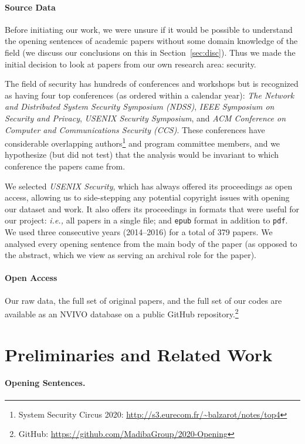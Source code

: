 \documentclass[sigconf]{acmart}
\newcommand{\ie}{\textit{i.e.,}\xspace}
\begin{document}
\paragraph{Source Data} Before initiating our work, we were unsure if it would be possible to understand the opening sentences of academic papers without some domain knowledge of the field (we discuss our conclusions on this in Section~\ref{sec:disc}). Thus we made the initial decision to look at papers from our own research area: security.

The field of security has hundreds of conferences and workshops but is recognized as having four top conferences (as ordered within a calendar year): \textit{The Network and Distributed System Security Symposium (NDSS)}, \textit{IEEE Symposium on Security and Privacy}, \textit{USENIX Security Symposium}, and \textit{ACM Conference on Computer and Communications Security (CCS)}. These conferences have considerable overlapping authors\footnote{System Security Circus 2020: \url{http://s3.eurecom.fr/~balzarot/notes/top4}} and program committee members, and we hypothesize (but did not test) that the analysis would be invariant to which conference the papers came from.

We selected \textit{USENIX Security}, which has always offered its proceedings as open access, allowing us to side-stepping any potential copyright issues with opening our dataset and work. It also offers its proceedings in formats that were useful for our project: \ie all papers in a single file; and \texttt{epub} format in addition to \texttt{pdf}. We used three consecutive years (2014--2016) for a total of 379 papers. We analysed every opening sentence from the main body of the paper (as opposed to the abstract, which we view as serving an archival role for the paper).

	\paragraph{Open Access} Our raw data, the full set of original papers, and the full set of our codes are available as an NVIVO database on a public GitHub repository.\footnote{GitHub: \url{https://github.com/MadibaGroup/2020-Opening}}

\section{Preliminaries and Related Work}



\paragraph{Opening Sentences.}
\end{document}
